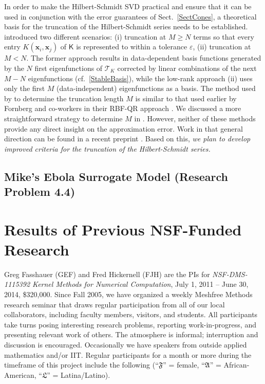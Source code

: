 \documentclass[11pt]{NSFamsart}
\newcommand{\mK}{\mathsf{K}}
\newcommand{\bx}{{\boldsymbol{x}}}
\newcommand{\cT}{\mathcal{T}}
\newcommand{\fA}{\mathfrak{A}}
\newcommand{\fF}{\mathfrak{F}}
\newcommand{\fL}{\mathfrak{L}}
\begin{document}
In order to make the Hilbert-Schmidt SVD practical and ensure that it can be used in conjunction with the error guarantees of Sect.~\ref{SectCones}, a theoretical basis for the truncation of the Hilbert-Schmidt series needs to be established. \cite{FMcC12} introduced two different scenarios: (i) truncation at $M\ge N$ terms so that every entry $K(\bx_i,\bx_j)$ of $\mK$ is represented to within a tolerance $\varepsilon$, (ii) truncation at $M < N$. The former approach results in data-dependent basis functions generated by the $N$ first eigenfunctions of $\cT_K$ corrected by linear combinations of the next $M-N$ eigenfunctions (cf.~\eqref{StableBasis}), while the low-rank approach (ii) uses only the first $M$ (data-independent) eigenfunctions as a basis. The method used by \cite{FMcC12} to determine the truncation length $M$ is similar to that used earlier by Fornberg and co-workers in their RBF-QR approach \citep{FornbergPiret08, FornbergFlyerLarsson11}.  We discussed a more straightforward strategy to determine $M$ in \cite{CavorettoEtAl14}. However, neither of these methods provide any direct insight on the approximation error. Work in that general direction can be found in a recent preprint \citep{GriebelRiegerZwicknagl13}. Based on this, \emph{we plan to develop improved criteria for the truncation of the Hilbert-Schmidt series.}

\subsection{Mike's Ebola Surrogate Model (Research Problem 4.4)}

\section{Results of Previous NSF-Funded Research}\label{SectPrevious}

Greg Fasshauer (GEF) and Fred Hickernell (FJH) are the PIs for \emph{NSF-DMS-1115392 Kernel Methods for Numerical Computation}, July 1, 2011 -- June 30, 2014, \$320,000.  Since Fall 2005, we have organized a weekly Meshfree Methods research seminar that draws regular participation from all of our local collaborators, including faculty members, visitors, and students.  All participants take turns posing interesting research problems, reporting work-in-progress, and presenting relevant work of others.  The atmosphere is informal; interruption and discussion is encouraged.  Occasionally we have speakers from outside applied mathematics and/or IIT. Regular participants for a month or more during the timeframe of this project include the following (``$\fF$'' = female,  ``$\fA$'' = African-American, ``$\fL$'' = Latina/Latino).
\end{document}
